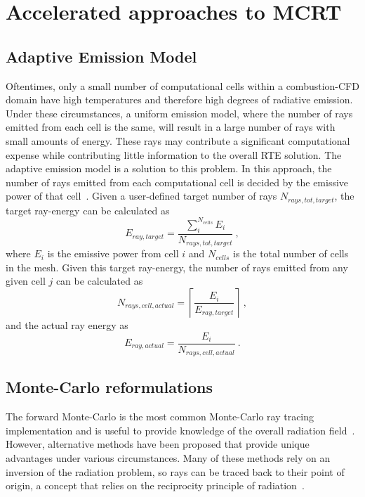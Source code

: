 \section{Accelerated approaches to MCRT}

\subsection{Adaptive Emission Model}\label{section:adaptiveemission}
Oftentimes, only a small number of computational cells within a combustion-CFD domain have high temperatures and therefore high degrees of radiative emission. Under these circumstances, a uniform emission model, where the number of rays emitted from each cell is the same, will result in a large number of rays with small amounts of energy. These rays may contribute a significant computational expense while contributing little information to the overall RTE solution.
The adaptive emission model is a solution to this problem. In this approach, the number of rays emitted from each computational cell is decided by the emissive power of that cell~\cite{Wang2007AnFields}.
Given a user-defined target number of rays $N_{rays,tot,target}$, the target ray-energy can be calculated as 
\begin{equation}
    E_{ray,target}=\frac{\sum^{N_{cells}}_{i}E_{i}}{N_{rays,tot,target}}~,
    \label{eq:TargetRayEnergy}
\end{equation}
where $E_i$ is the emissive power from cell $i$ and $N_{cells}$ is the total number of cells in the mesh. 
Given this target ray-energy, the number of rays emitted from any given cell $j$ can be calculated as
\begin{equation}
    N_{rays,cell,actual}=\left\lceil{\frac{E_{i}}{E_{ray,target}}}\right\rceil{}~,
    \label{eq:NumberOfRays}
\end{equation}
and the actual ray energy as
\begin{equation}
    E_{ray,actual}=\frac{E_{i}}{N_{rays,cell,actual}}~.
    \label{eq:RayEnergies}
\end{equation}

\subsection{Monte-Carlo reformulations}\label{section:reformulations}
The forward Monte-Carlo is the most common Monte-Carlo ray tracing implementation and is useful to provide knowledge of the overall radiation field~\cite{Modest2022ChapterMediac}. However, alternative methods have been proposed that provide unique advantages under various circumstances.
Many of these methods rely on an inversion of the radiation problem, so rays can be traced back to their point of origin, a concept that relies on the reciprocity principle of radiation~\cite{Case1957TransferPrinciple}.

